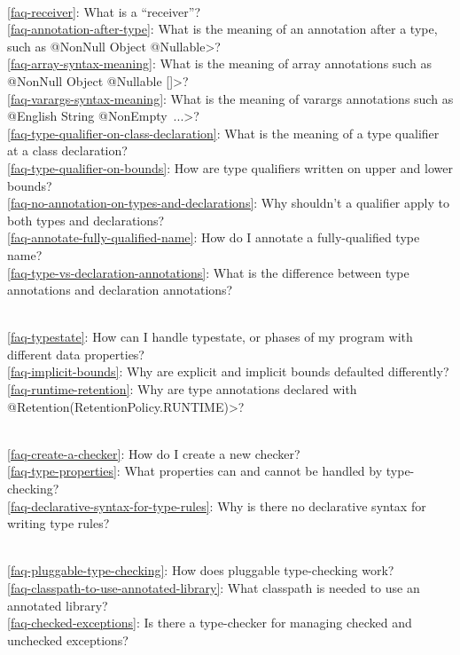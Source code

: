 \\ \ref{faq-receiver}: What is a ``receiver''?
\\ \ref{faq-annotation-after-type}: What is the meaning of an annotation after a type, such as \<@NonNull Object @Nullable>?
\\ \ref{faq-array-syntax-meaning}: What is the meaning of array annotations such as \<@NonNull Object @Nullable []>?
\\ \ref{faq-varargs-syntax-meaning}: What is the meaning of varargs annotations such as \<@English String @NonEmpty~...>?
\\ \ref{faq-type-qualifier-on-class-declaration}: What is the meaning of a type qualifier at a class declaration?
\\ \ref{faq-type-qualifier-on-bounds}: How are type qualifiers written on upper and lower bounds?
\\ \ref{faq-no-annotation-on-types-and-declarations}: Why shouldn't a qualifier apply to both types and declarations?
\\ \ref{faq-annotate-fully-qualified-name}: How do I annotate a
fully-qualified type name?
\\ \ref{faq-type-vs-declaration-annotations}: What is the difference between type annotations and declaration annotations?

\\ \ref{faq-typestate}: How can I handle typestate, or phases of my program with different data properties?
\\ \ref{faq-implicit-bounds}: Why are explicit and implicit bounds defaulted differently?
\\ \ref{faq-runtime-retention}: Why are type annotations declared with \<@Retention(RetentionPolicy.RUNTIME)>?

\\ \ref{faq-create-a-checker}: How do I create a new checker?
\\ \ref{faq-type-properties}: What properties can and cannot be handled by type-checking?
\\ \ref{faq-declarative-syntax-for-type-rules}: Why is there no declarative syntax for writing type rules?

\\ \ref{faq-pluggable-type-checking}: How does pluggable type-checking work?
\\ \ref{faq-classpath-to-use-annotated-library}: What classpath is needed to use an annotated library?
\\ \ref{faq-checked-exceptions}: Is there a type-checker for managing checked and unchecked exceptions?


